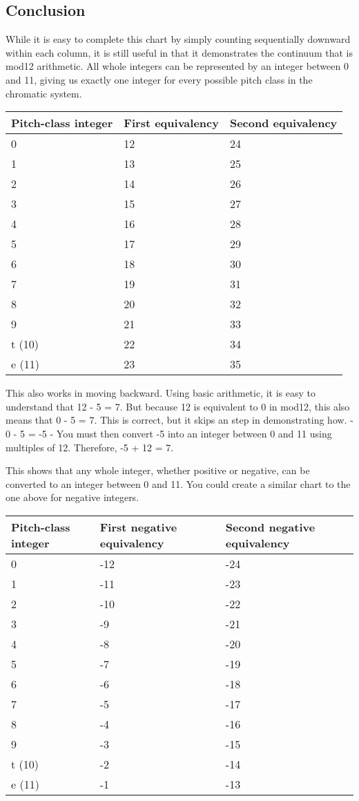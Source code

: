 \documentclass{book}
\begin{document}
\hypertarget{conclusion-2}{%
\subsection{Conclusion}\label{conclusion-2}}

While it is easy to complete this chart by simply counting sequentially
downward within each column, it is still useful in that it demonstrates the
continuum that is mod12 arithmetic. All whole integers can be represented by
an integer between 0 and 11, giving us exactly one integer for every possible
pitch class in the chromatic system.

\begin{longtable}[]{@{}lll@{}}
\toprule
Pitch-class integer & First equivalency & Second equivalency \\
\midrule
\endhead
0 & 12 & 24 \\
1 & 13 & 25 \\
2 & 14 & 26 \\
3 & 15 & 27 \\
4 & 16 & 28 \\
5 & 17 & 29 \\
6 & 18 & 30 \\
7 & 19 & 31 \\
8 & 20 & 32 \\
9 & 21 & 33 \\
t (10) & 22 & 34 \\
e (11) & 23 & 35 \\
\bottomrule
\end{longtable}

This also works in moving backward. Using basic arithmetic, it is easy to
understand that 12 - 5 = 7. But because 12 is equivalent to 0 in mod12, this
also means that 0 - 5 = 7. This is correct, but it skips an step in
demonstrating how. - 0 - 5 = -5 - You must then convert -5 into an integer
between 0 and 11 using multiples of 12. Therefore, -5 + 12 = 7.

This shows that any whole integer, whether positive or negative, can be
converted to an integer between 0 and 11. You could create a similar chart to
the one above for negative integers.

\begin{longtable}[]{@{}lll@{}}
\toprule
Pitch-class integer & First negative equivalency & Second negative
equivalency \\
\midrule
\endhead
0 & -12 & -24 \\
1 & -11 & -23 \\
2 & -10 & -22 \\
3 & -9 & -21 \\
4 & -8 & -20 \\
5 & -7 & -19 \\
6 & -6 & -18 \\
7 & -5 & -17 \\
8 & -4 & -16 \\
9 & -3 & -15 \\
t (10) & -2 & -14 \\
e (11) & -1 & -13 \\
\bottomrule
\end{longtable}
\end{document}
